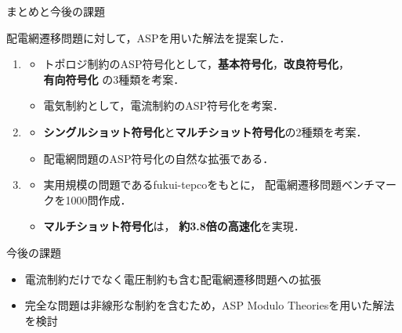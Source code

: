 \documentclass[dvipdfmx,11pt]{beamer}
\begin{document}
\begin{frame}{まとめと今後の課題}
 \begin{alertblock}{}
  \centering
  配電網遷移問題に対して，ASPを用いた解法を提案した．
 \end{alertblock}
 \vfill
  \begin{enumerate}
   \item {}
         \begin{itemize}
          \item トポロジ制約のASP符号化として，\textbf{基本符号化}，\textbf{改良符号化}，
                \\ \alert{\bf 有向符号化} の3種類を考案．
          \item 電気制約として，電流制約のASP符号化を考案．
         \end{itemize}
   \item {}
         \begin{itemize}
          \item \textbf{シングルショット符号化}と\alert{\bf マルチショット符号化}の2種類を考案．
          \item 配電網問題のASP符号化の自然な拡張である．
         \end{itemize}
   \item {}
         \begin{itemize}
          \item 実用規模の問題である\textsf{fukui-tepco}をもとに，
                配電網遷移問題ベンチマークを1000問作成．
          \item \textbf{マルチショット符号化}は，
                \alert{\bf 約3.8倍の高速化}を実現．
         \end{itemize}
  \end{enumerate}
 \vfill
 \begin{exampleblock}{今後の課題}
\begin{itemize}
 \item 電流制約だけでなく電圧制約も含む配電網遷移問題への拡張
 \item 完全な問題は非線形な制約を含むため，ASP Modulo Theoriesを用いた解法を検討
\end{itemize}
 \end{exampleblock}
\end{frame}



\end{document}
